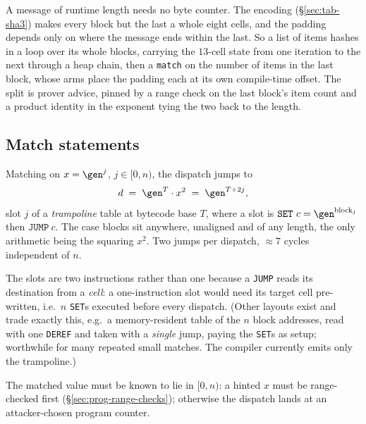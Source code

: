 A message of runtime length needs no byte counter. The encoding (\S\ref{sec:tab-sha3}) makes every block but the last a whole eight cells, and the padding depends only on where the message ends within the last. So a list of items hashes in a loop over its whole blocks, carrying the $13$-cell state from one iteration to the next through a heap chain, then a \texttt{match} on the number of items in the last block, whose arms place the padding each at its own compile-time offset. The split is prover advice, pinned by a range check on the last block's item count and a product identity in the exponent tying the two back to the length.

\subsection{Match statements}\label{sec:prog-match}

Matching on $x=\gen^{j}$, $j\in[0,n)$, the dispatch jumps to
\[
  d \;=\; \gen^{T}\cdot x^{2} \;=\; \gen^{T+2j},
\]
slot $j$ of a \emph{trampoline} table at bytecode base $T$, where a slot is $\texttt{SET}\ c=\gen^{\mathrm{block}_j}$ then $\texttt{JUMP}\ c$. The case blocks sit anywhere, unaligned and of any length, the only arithmetic being the squaring $x^{2}$. Two jumps per dispatch, $\approx7$ cycles independent of $n$.

The slots are two instructions rather than one because a \texttt{JUMP} reads its destination from a \emph{cell}: a one-instruction slot would need its target cell pre-written, i.e.\ $n$ \texttt{SET}s executed before every dispatch. (Other layouts exist and trade exactly this, e.g.\ a memory-resident table of the $n$ block addresses, read with one \texttt{DEREF} and taken with a \emph{single} jump, paying the \texttt{SET}s as setup; worthwhile for many repeated small matches. The compiler currently emits only the trampoline.)

The matched value must be known to lie in $[0,n)$: a hinted $x$ must be range-checked first (\S\ref{sec:prog-range-checks}); otherwise the dispatch lands at an attacker-chosen program counter.
